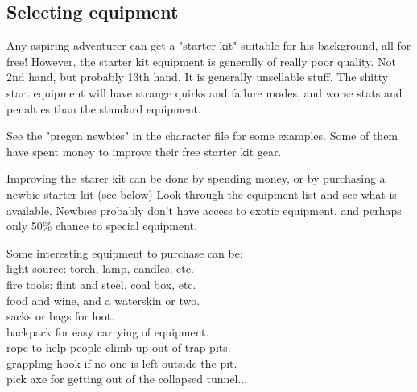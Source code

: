 %


\subsection*{Selecting equipment}
Any aspiring adventurer can get a "starter kit" suitable for his background, all for free! However, the starter kit equipment is generally of really poor quality. Not 2nd hand, but probably 13th hand. It is generally unsellable stuff. The shitty start equipment will have strange quirks and failure modes, and worse stats and penalties than the standard equipment.

See the "pregen newbies" in the character file for some examples. Some of them have spent money to improve their free starter kit gear.


Improving the starer kit can be done by spending money, or by purchasing a newbie starter kit (see below) Look through the equipment list and see what is available. Newbies probably don't have access to exotic equipment, and perhaps only 50\% chance to special equipment.

Some interesting equipment to purchase can be: \\
light source: torch, lamp, candles, etc. \\
fire tools: flint and steel, coal box, etc. \\
food and wine, and a waterskin or two. \\
sacks or bags for loot. \\
backpack for easy carrying of equipment. \\
rope to help people climb up out of trap pits. \\
grappling hook if no-one is left outside the pit. \\
pick axe for getting out of the collapsed tunnel...

